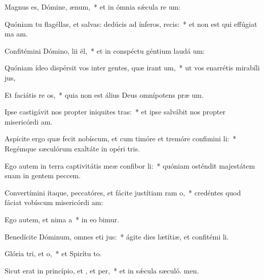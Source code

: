 \item Magnus es, Dómine,  ænum,~* et in ómnia sǽcula re um:
\item Quóniam tu flagéllas, et salvas: dedúcis ad ínferos,  recis:~* et non est qui effúgiat ma am.
\item Confitémini Dómino, lii ël,~* et in conspéctu géntium laudá um:
\item Quóniam ídeo dispérsit vos inter gentes, quæ irant um,~* ut vos enarrétis mirabíli jus,
\item Et faciátis re os,~* quia non est álius Deus omnípotens præ um.
\item Ipse castigávit nos propter iniquites tras:~* et ipse salvábit nos propter misericórdi am.
\item Aspícite ergo quæ fecit nobíscum, et cum timóre et tremóre confimini li:~* Regémque sæculórum exaltáte in opéri tris.
\item Ego autem in terra captivitátis meæ confibor li:~* quóniam osténdit majestátem suam in gentem peccem.
\item Convertímini ítaque, peccatóres, et fácite justítiam ram o,~* credéntes quod fáciat vobíscum misericórdi am:
\item Ego autem, et nima a~* in eo bimur.
\item Benedícite Dóminum, omnes eti jus:~* ágite dies lætítiæ, et confitémi li.
\item Glória tri, et o,~* et Spirítu to.
\item Sicut erat in princípio, et , et per,~* et in sǽcula sæculó. men.
